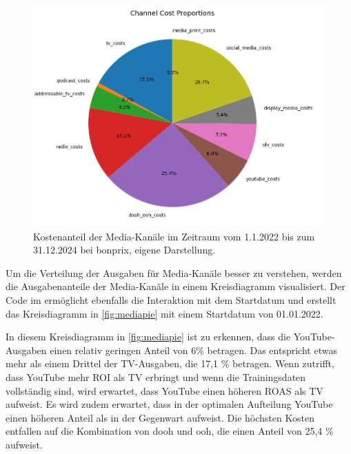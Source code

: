 \begin{figure}[H]
    \centering
    \includegraphics[width=0.8\linewidth]{images/mediapie.png}
    \caption{Kostenanteil der Media-Kanäle im Zeitraum vom 1.1.2022 bis zum 31.12.2024 bei bonprix, eigene Darstellung.}
    \label{fig:mediapie}
\end{figure}
\noindent
Um die Verteilung der Ausgaben für Media-Kanäle besser zu verstehen, werden die Ausgabenanteile der Media-Kanäle in einem Kreisdiagramm visualisiert. Der Code im  ermöglicht ebenfalls die Interaktion mit dem Startdatum und erstellt das Kreisdiagramm in \autoref{fig:mediapie} mit einem Startdatum von 01.01.2022.\par
In diesem Kreisdiagramm in \autoref{fig:mediapie} ist zu erkennen, dass die YouTube-Ausgaben einen relativ geringen Anteil von 6\% betragen. Das entspricht etwas mehr als einem Drittel der TV-Ausgaben, die 17,1 \% betragen. Wenn  zutrifft, dass YouTube mehr \ac{ROI} als TV erbringt und wenn die Trainingsdaten vollständig sind, wird erwartet, dass YouTube einen höheren \ac{ROAS} als TV aufweist. Es wird zudem erwartet, dass in der optimalen Aufteilung YouTube einen höheren Anteil als in der Gegenwart aufweist. Die höchsten Kosten entfallen auf die Kombination von \ac{dooh} und \ac{ooh}, die einen Anteil von 25,4 \% aufweist.
\newpage
